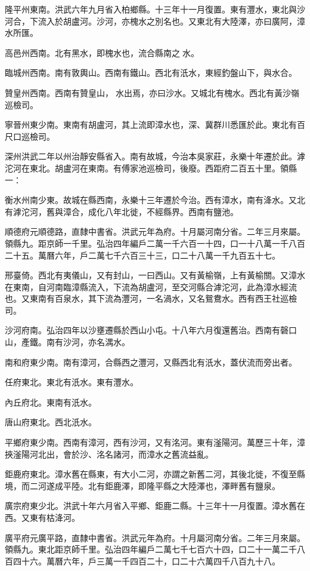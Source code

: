 隆平州東南。洪武六年九月省入柏鄉縣。十三年十一月復置。東有灃水，東北與沙河合，下流入於胡盧河。沙河，亦槐水之別名也。又東北有大陸澤，亦曰廣阿，漳水所匯。

高邑州西南。北有黑水，即槐水也，流合縣南之水。

臨城州西南。南有敦輿山。西南有鐵山。西北有汦水，東經釣盤山下，與水合。

贊皇州西南。西南有贊皇山，水出焉，亦曰沙水。又城北有槐水。西北有黃沙嶺巡檢司。

寧晉州東少南。東南有胡盧河，其上流即漳水也，深、冀群川悉匯於此。東北有百尺口巡檢司。

深州洪武二年以州治靜安縣省入。南有故城，今治本吳家莊，永樂十年遷於此。滹沱河在東北。胡盧河在東南。有傅家池巡檢司，後廢。西距府二百五十里。領縣一：

衡水州南少東。故城在縣西南，永樂十三年遷於今治。西有漳水，南有洚水。又北有滹沱河，舊與漳合，成化八年北徙，不經縣界。西南有鹽池。

順德府元順德路，直隸中書省。洪武元年為府。十月屬河南分省。二年三月來屬。領縣九。距京師一千里。弘治四年編戶二萬一千六百一十四，口一十八萬一千八百二十五。萬曆六年，戶二萬七千六百三十三，口二十八萬一千九百五十七。

邢臺倚。西北有夷儀山，又有封山，一曰西山。又有黃榆嶺，上有黃榆關。又漳水在東南，自河南臨漳縣流入，下流為胡盧河，至交河縣合滹沱河，此為漳水經流也。又東南有百泉水，其下流為灃河，一名渦水，又名鴛鴦水。西有西王社巡檢司。

沙河府南。弘治四年以沙壅遷縣於西山小屯。十八年六月復還舊治。西南有磬口山，產鐵。南有沙河，亦名湡水。

南和府東少南。南有漳河，合縣西之灃河，又縣西北有汦水，蓋伏流而旁出者。

任府東北。東北有汦水。東有灃水。

內丘府北。東南有汦水。

唐山府東北。西北汦水。

平鄉府東少南。西南有漳河，西有沙河，又有洺河。東有滏陽河。萬歷三十年，漳挾滏陽河北出，會於沙、洺名諸河，而漳水之舊流益亂。

鉅鹿府東北。漳水舊在縣東，有大小二河，亦謂之新舊二河，其後北徙，不復至縣境，而二河遂成平陸。北有鉅鹿澤，即隆平縣之大陸澤也，澤畔舊有鹽泉。

廣宗府東少北。洪武十年六月省入平鄉、鉅鹿二縣。十三年十一月復置。漳水舊在西。又東有枯洚河。

廣平府元廣平路，直隸中書省。洪武元年為府。十月屬河南分省。二年三月來屬。領縣九。東北距京師千里。弘治四年編戶二萬七千七百六十四，口二十一萬二千八百四十六。萬曆六年，戶三萬一千四百二十，口二十六萬四千八百九十八。

